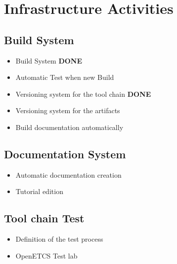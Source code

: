 \documentclass{openetcs_report}
\begin{document}
\section{Infrastructure Activities}
\label{sec-2-infrastructure}

\subsection{Build System}
\begin{itemize}
\item Build System {\bf DONE}
\item Automatic Test when new Build
\item Versioning system  for the tool chain {\bf DONE}
\item Versioning system for the artifacts
\item Build documentation automatically
\end{itemize}

\subsection{Documentation System}
\begin{itemize}
\item Automatic documentation creation
\item Tutorial  edition
\end{itemize}

\subsection{Tool chain Test}
\begin{itemize}
\item Definition of the test process
\item OpenETCS Test lab
\end{itemize}
\end{document}
